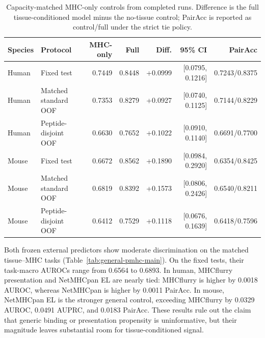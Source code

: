 \begin{table}[tbp]
\centering
\caption{Capacity-matched MHC-only controls from completed runs. Difference is the full tissue-conditioned model minus the no-tissue control; PairAcc is reported as control/full under the strict tie policy.}
\label{tab:mhc-only-control}
\scriptsize
\setlength{\tabcolsep}{1.5pt}
\begin{tabular}{@{}llrrrrr@{}}
\toprule
Species & Protocol & MHC-only & Full & Diff. & 95\% CI & PairAcc \\
\midrule
Human & Fixed test & 0.7449 & 0.8448 & +0.0999 & [0.0795, 0.1216] & 0.7243/0.8375 \\
Human & Matched standard OOF & 0.7353 & 0.8279 & +0.0927 & [0.0740, 0.1125] & 0.7144/0.8229 \\
Human & Peptide-disjoint OOF & 0.6630 & 0.7652 & +0.1022 & [0.0910, 0.1140] & 0.6691/0.7700 \\
Mouse & Fixed test & 0.6672 & 0.8562 & +0.1890 & [0.0984, 0.2920] & 0.6354/0.8425 \\
Mouse & Matched standard OOF & 0.6819 & 0.8392 & +0.1573 & [0.0806, 0.2426] & 0.6540/0.8211 \\
Mouse & Peptide-disjoint OOF & 0.6412 & 0.7529 & +0.1118 & [0.0676, 0.1639] & 0.6418/0.7596 \\
\bottomrule
\end{tabular}
\end{table}

Both frozen external predictors show moderate discrimination on the matched tissue--MHC tasks (Table~\ref{tab:general-pmhc-main}). On the fixed tests, their task-macro AUROCs range from 0.6564 to 0.6893. In human, MHCflurry presentation and NetMHCpan EL are nearly tied: MHCflurry is higher by 0.0018 AUROC, whereas NetMHCpan is higher by 0.0011 PairAcc. In mouse, NetMHCpan EL is the stronger general control, exceeding MHCflurry by 0.0329 AUROC, 0.0491 AUPRC, and 0.0183 PairAcc. These results rule out the claim that generic binding or presentation propensity is uninformative, but their magnitude leaves substantial room for tissue-conditioned signal.

